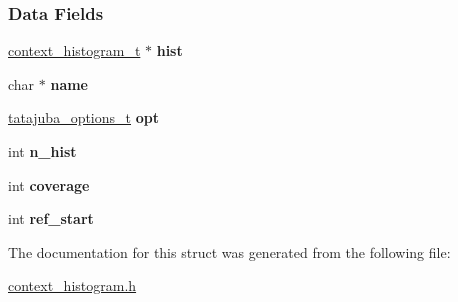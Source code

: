 \subsubsection*{Data Fields}
\begin{DoxyCompactItemize}
\item 
\mbox{\label{structgenomic__context__list__struct_a1cb37907dc0afe1bd82be4e3a0dbf3a3}} 
\hyperlink{structcontext__histogram__struct}{context\+\_\+histogram\+\_\+t} $\ast$ {\bfseries hist}
\item 
\mbox{\label{structgenomic__context__list__struct_a10ecf9ca3ce5e870d018b0bc2c5f0d79}} 
char $\ast$ {\bfseries name}
\item 
\mbox{\label{structgenomic__context__list__struct_a55ae739966d02af47a49b9834bef888b}} 
\hyperlink{structtatajuba__options__t}{tatajuba\+\_\+options\+\_\+t} {\bfseries opt}
\item 
\mbox{\label{structgenomic__context__list__struct_a4fe4f81eb544cc857a1b50fdc7f62435}} 
int {\bfseries n\+\_\+hist}
\item 
\mbox{\label{structgenomic__context__list__struct_ae70d8d57401f88f4e07f73a5077053dd}} 
int {\bfseries coverage}
\item 
\mbox{\label{structgenomic__context__list__struct_a7534768a48e086d0a060ecf6ccb3c5ae}} 
int {\bfseries ref\+\_\+start}
\end{DoxyCompactItemize}


The documentation for this struct was generated from the following file\+:\begin{DoxyCompactItemize}
\item 
\hyperlink{context__histogram_8h}{context\+\_\+histogram.\+h}\end{DoxyCompactItemize}
